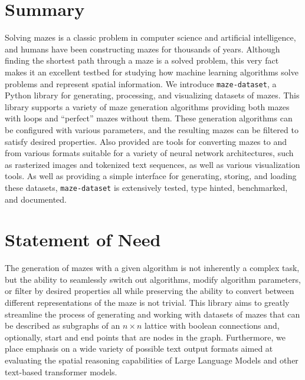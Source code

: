 \documentclass[10pt,a4paper,onecolumn]{article}
\let\origfigure\figure
\let\endorigfigure\endfigure
\renewenvironment{figure}[1][2] {
    \expandafter\origfigure\expandafter[H]
} {
    \endorigfigure
}
\begin{document}
\hypertarget{summary}{%
\section{Summary}\label{summary}}

Solving mazes is a classic problem in computer science and artificial
intelligence, and humans have been constructing mazes for thousands of
years. Although finding the shortest path through a maze is a solved
problem, this very fact makes it an excellent testbed for studying how
machine learning algorithms solve problems and represent spatial
information. We introduce \texttt{maze-dataset}, a Python library for
generating, processing, and visualizing datasets of mazes. This library
supports a variety of maze generation algorithms providing both mazes
with loops and ``perfect'' mazes without them. These generation
algorithms can be configured with various parameters, and the resulting
mazes can be filtered to satisfy desired properties. Also provided are
tools for converting mazes to and from various formats suitable for a
variety of neural network architectures, such as rasterized images and
tokenized text sequences, as well as various visualization tools. As
well as providing a simple interface for generating, storing, and
loading these datasets, \texttt{maze-dataset} is extensively tested,
type hinted, benchmarked, and documented.

\begin{figure} 
  \begin{minipage}{5in}
     
  \end{minipage}
  \caption{
    Usage of maze-dataset. We create a \texttt{MazeDataset} from a \texttt{MazeDatasetConfig}. This contains \texttt{SolvedMaze} objects which can be converted to and from a variety of formats. Code in the image contains clickable links to \href{https://understanding-search.github.io/maze-dataset/maze_dataset.html}{documentation}. A variety of generated examples can be viewed \href{https://understanding-search.github.io/maze-dataset/examples/maze_examples.html}{here}.
  }
  \label{fig:diagram}
\end{figure}

\hypertarget{statement-of-need}{%
\section{Statement of Need}\label{statement-of-need}}

The generation of mazes with a given algorithm is not inherently a
complex task, but the ability to seamlessly switch out algorithms,
modify algorithm parameters, or filter by desired properties all while
preserving the ability to convert between different representations of
the maze is not trivial. This library aims to greatly streamline the
process of generating and working with datasets of mazes that can be
described as subgraphs of an \(n \times n\) lattice with boolean
connections and, optionally, start and end points that are nodes in the
graph. Furthermore, we place emphasis on a wide variety of possible text
output formats aimed at evaluating the spatial reasoning capabilities of
Large Language Models and other text-based transformer models.
\end{document}
